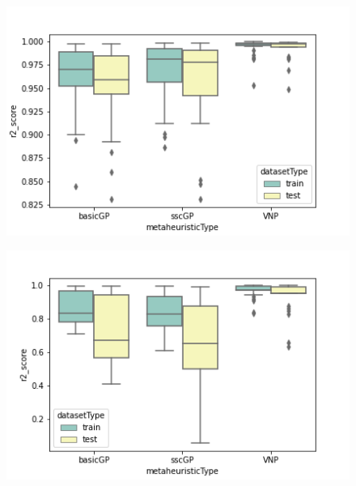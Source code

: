 \documentclass[main.tex]{subfiles}
\begin{document}
\begin{figure}
\centering
\begin{minipage}{.5\textwidth}
  \centering
  \includegraphics[width=1.1\linewidth]{../images/f7.png}
  \label{fig:f7}
\end{minipage}%
\begin{minipage}{.5\textwidth}
  \centering
  \includegraphics[width=1.1\linewidth]{../images/f8.png}
  \label{fig:f8}
\end{minipage}
\end{figure}
\end{document}
